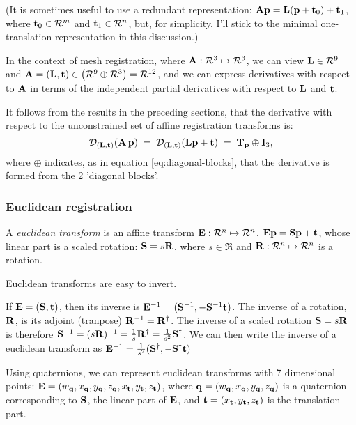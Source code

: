 (It is sometimes useful to use a redundant representation:
$\A \p = \L (\p + \t_0) + \t_1$,
where $\t_0 \in \Re^m$ and $\t_1 \in \Re^n$,
but, for simplicity, I'll stick to the minimal one-translation
representation in this discussion.)

In the context of mesh registration,
where $\A : \Re^3 \mapsto \Re^3$,
we can view $\L \in \Re^9$ and
$\A = (\L, \t) \in \left(\Re^9 \oplus \Re^3 \right)= \Re^{12}$,
and we can express derivatives with respect to $\A$
in terms of the independent partial derivatives
with respect to $\L$ and $\t$.

It follows from the results in the preceding sections,
that the derivative with respect to the
unconstrained set of affine registration transforms is:
\begin{equation}
\label{eq:affine-transform-derivative}
\Df{(\L,\t)}{\left( \A \, \p \right)}
 \; = \;
\Df{(\L,\t)}{\left( \L \p + \t \right)}
 \; = \;
\Tr_{\p} \oplus \I_3,
\end{equation}
where $\oplus$ indicates,
as in equation \ref{eq:diagonal-blocks},
that the derivative is formed from the 2
'diagonal blocks'.

\subsubsection{Euclidean registration}
\label{sec:euclidean-registration}

A {\it euclidean transform} is an affine transform
$\Eu : \Re^n \mapsto \Re^n$,
$\Eu \p = \Sc \p + \t $,
whose linear part is a scaled rotation:
$\Sc = s \R$,
where $s \in \Re$ and $\R : \Re^n \mapsto \Re^n$
is a rotation.

Euclidean transforms are easy to invert.

If $\Eu = (\Sc,\t)$, then its inverse is
$\Eu^{-1} = (\Sc^{-1}, - \Sc^{-1}\t)$.
The inverse of a rotation, $\R$, is its adjoint
(tranpose) $\R^{-1} = \R^{\dagger}$.
The inverse of a scaled rotation $\Sc = s \R$
is therefore
$\Sc^{-1} = (s \R)^{-1}
         = {1 \over s} \R^{\dagger}
         = {1 \over {s^2}} \Sc^{\dagger}$.
We can then write the inverse of a euclidean transform as
$\Eu^{-1} = {1 \over {s^2}}(\Sc^{\dagger}, - \Sc^{\dagger}\t)$

Using quaternions, we can represent euclidean transforms with
7 dimensional points:
$\Eu = (w_{\q}, x_{\q}, y_{\q}, z_{\q}, x_{\t}, y_{\t}, z_{\t})$,
where $\q = (w_{\q}, x_{\q}, y_{\q}, z_{\q})$ is a quaternion corresponding
to $\S$, the linear part of $\Eu$,
and $\t = (x_{\t}, y_{\t}, z_{\t})$ is the translation part.

